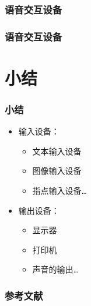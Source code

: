 \documentclass{beamer}
\begin{document}
\subsubsection{语音交互设备}
\begin{frame}
	\frametitle{语音交互设备}

\end{frame}

\section{小结}
\begin{frame}
	\frametitle{小结}
	\begin{itemize}
		\item 输入设备：
		\begin{itemize}
			\item 文本输入设备
			\item 图像输入设备
			\item 指点输入设备\dots
		\end{itemize}
		\item 输出设备：
		\begin{itemize}
			\item 显示器 
			\item 打印机
			\item 声音的输出\dots
		\end{itemize}
	\end{itemize}
\end{frame}
 
\begin{frame}
	\frametitle{参考文献}
	
	
\end{frame}
\end{document}
